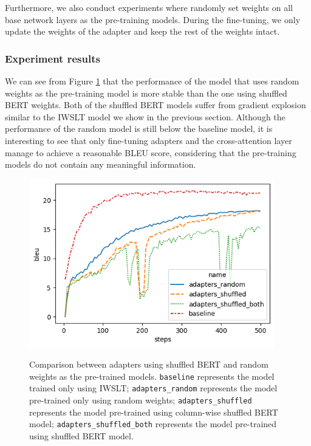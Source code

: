 Furthermore, we also conduct experiments where randomly set weights on all base network layers as the pre-training models. During the fine-tuning, we only update the weights of the adapter and keep the rest of the weights intact.

\subsubsection{Experiment results}
We can see from Figure \ref{img:shfrndcmp} that the performance of the model that uses random weights as the pre-training model is more stable than the one using shuffled BERT weights. Both of the shuffled BERT models suffer from gradient explosion similar to the IWSLT model we show in the previous section. Although the performance of the random model is still below the baseline model, it is interesting to see that only fine-tuning adapters and the cross-attention layer manage to achieve a reasonable BLEU score, considering that the pre-training models do not contain any meaningful information.
\begin{figure}[h]
    {\includegraphics[width=0.95\textwidth]{img/randomshuffled.png}}
    \centering
    \caption{Comparison between adapters using shuffled BERT and random weights as the pre-trained models. \texttt{baseline} represents the model trained only using IWSLT; \texttt{adapters\_random} represents the model pre-trained only using random weights; \texttt{adapters\_shuffled} represents the model pre-trained using column-wise shuffled BERT model; \texttt{adapters\_shuffled\_both} represents the model pre-trained using shuffled BERT model.}
    \label{img:shfrndcmp}
\end{figure}

